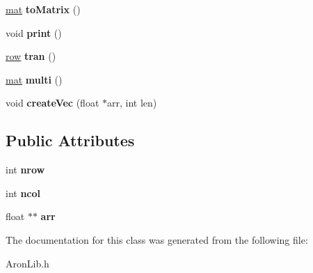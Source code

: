 \begin{DoxyCompactItemize}
\item 
\mbox{\label{class_matrix_vector_1_1vec_a621b533b86d8986174e4b88c875a6c63}} 
\mbox{\hyperlink{class_matrix_vector_1_1mat}{mat}} {\bfseries to\+Matrix} ()
\item 
\mbox{\label{class_matrix_vector_1_1vec_a4602af813ed7eb84612e578aab0b91d0}} 
void {\bfseries print} ()
\item 
\mbox{\label{class_matrix_vector_1_1vec_a2a2c95e44ec5fef8cbdcc8beca765b42}} 
\mbox{\hyperlink{class_matrix_vector_1_1row}{row}} {\bfseries tran} ()
\item 
\mbox{\label{class_matrix_vector_1_1vec_a29697cf7bf95776710f673d6ea076d0f}} 
\mbox{\hyperlink{class_matrix_vector_1_1mat}{mat}} {\bfseries multi} ()
\item 
\mbox{\label{class_matrix_vector_1_1vec_aaebd70c13be5311384dcf2bfdf4435fe}} 
void {\bfseries create\+Vec} (float $\ast$arr, int len)
\end{DoxyCompactItemize}
\subsection*{Public Attributes}
\begin{DoxyCompactItemize}
\item 
\mbox{\label{class_matrix_vector_1_1vec_a9b2e20b78d4e28c76c5de2da43a9c952}} 
int {\bfseries nrow}
\item 
\mbox{\label{class_matrix_vector_1_1vec_aa0dc168f0f03f45db4aa9eee3234aa9c}} 
int {\bfseries ncol}
\item 
\mbox{\label{class_matrix_vector_1_1vec_a5de4551d33631073af9e3fa31b13a508}} 
float $\ast$$\ast$ {\bfseries arr}
\end{DoxyCompactItemize}


The documentation for this class was generated from the following file\+:\begin{DoxyCompactItemize}
\item 
Aron\+Lib.\+h\end{DoxyCompactItemize}
